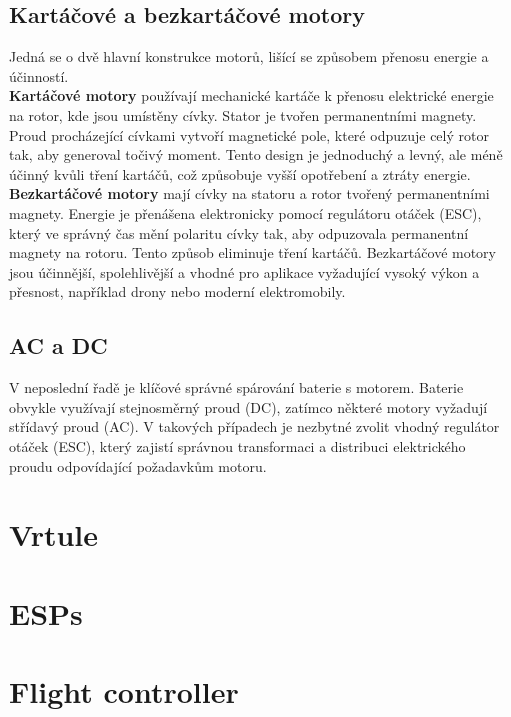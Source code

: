 \documentclass[12pt]{report}
\begin{document}
\subsection{Kartáčové a bezkartáčové motory}
Jedná se o dvě hlavní konstrukce motorů, lišící se způsobem přenosu energie a účinností.\\
\textbf{Kartáčové motory} používají mechanické kartáče k přenosu elektrické energie na rotor, kde jsou umístěny cívky. Stator je tvořen permanentními magnety. Proud procházející cívkami vytvoří magnetické pole, které odpuzuje celý rotor tak, aby generoval točivý moment. Tento design je jednoduchý a levný, ale méně účinný kvůli tření kartáčů, což způsobuje vyšší opotřebení a ztráty energie.\\
\textbf{Bezkartáčové motory} mají cívky na statoru a rotor tvořený permanentními magnety. Energie je přenášena elektronicky pomocí regulátoru otáček (ESC), který ve správný čas mění polaritu cívky tak, aby odpuzovala permanentní magnety na rotoru. Tento způsob eliminuje tření kartáčů. Bezkartáčové motory jsou účinnější, spolehlivější a vhodné pro aplikace vyžadující vysoký výkon a přesnost, například drony nebo moderní elektromobily.

\subsection{AC a DC}
V neposlední řadě je klíčové správné spárování baterie s motorem. Baterie obvykle využívají stejnosměrný proud (DC), zatímco některé motory vyžadují střídavý proud (AC). V takových případech je nezbytné zvolit vhodný regulátor otáček (ESC), který zajistí správnou transformaci a distribuci elektrického proudu odpovídající požadavkům motoru. \cite{mainbook} \cite{dojo} \cite{ultimateguide} \cite{motors}



\section{Vrtule}

\lipsum[1]

\section{ESPs}

\lipsum[2]

\section{Flight controller}
\lipsum[3]
\end{document}
